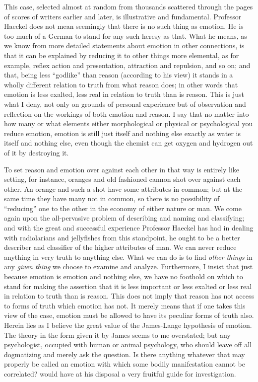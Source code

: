 \documentclass[a4paper, 11pt, oneside, polutonikogreek, english]{article}
\begin{document}
This case, selected almost at random from thousands scattered through the pages of scores of writers earlier and later, is illustrative and fundamental. Professor Haeckel does not mean seemingly that there is no such thing as emotion. He is too much of a German to stand for any such heresy as that. What he means, as we know from more detailed statements about emotion in other connections, is that it can be explained by reducing it to other things more elemental, as for example, reflex action and presentation, attraction and repulsion, and so on; and that, being less ``godlike'' than reason (according to his view) it stands in a wholly different relation to truth from what reason does; in other words that emotion is less exalted, less real in relation to truth than is reason. This is just what I deny, not only on grounds of personal experience but of observation and reflection on the workings of both emotion and reason. I say that no matter into how many or what elements either morphological or physical or psychological you reduce emotion, emotion is still just itself and nothing else exactly as water is itself and nothing else, even though the chemist can get oxygen and hydrogen out of it by destroying it.

To set reason and emotion over against each other in that way is entirely like setting, for instance, oranges and old fashioned cannon shot over against each other. An orange and such a shot have some attributes-in-common; but at the same time they have many not in common, so there is no possibility of ``reducing'' one to the other in the economy of either nature or man. We come again upon the all-pervasive problem of describing and naming and classifying; and with the great and successful experience Professor Haeckel has had in dealing with radiolarians and jellyfishes from this standpoint, he ought to be a better describer and classifier of the higher attributes of man. We can never reduce anything in very truth to anything else. What we can do is to find \emph{other things} in any \emph{given thing} we choose to examine and analyze. Furthermore, I insist that just because emotion is emotion and nothing else, we have no foothold on which to stand for making the assertion that it is less important or less exalted or less real in relation to truth than is reason. This does not imply that reason has not access to forms of truth which emotion has not. It merely means that if one takes this view of the case, emotion must be allowed to have its peculiar forms of truth also. Herein lies as I believe the great value of the James-Lange hypothesis of emotion. The theory in the form given it by James seems to me overstated; but any psychologist, occupied with human or animal psychology, who should leave off all dogmatizing and merely ask the question. Is there anything whatever that may properly be called an emotion with which some bodily manifestation cannot be correlated? would have at his disposal a very fruitful guide for investigation.
\end{document}
